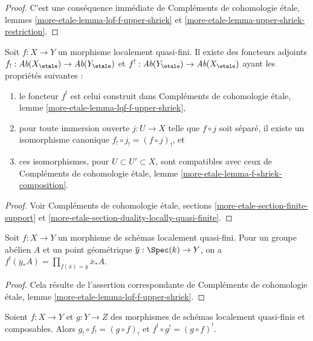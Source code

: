 \begin{proof}
C'est une conséquence immédiate de Compléments de cohomologie étale, lemmes
\ref{more-etale-lemma-lqf-f-upper-shriek} et
\ref{more-etale-lemma-upper-shriek-restriction}.
\end{proof}

\begin{proposition}
\label{proposition-lqf-shriek}
Soit $f : X \to Y$ un morphisme localement quasi-fini. Il existe des
foncteurs adjoints $f_! : \textit{Ab}(X_\etale) \to \textit{Ab}(Y_\etale)$
et $f^! : \textit{Ab}(Y_\etale) \to \textit{Ab}(X_\etale)$
ayant les propriétés suivantes :
\begin{enumerate}
\item le foncteur $f^!$ est celui construit dans Compléments de cohomologie
étale, lemme \ref{more-etale-lemma-lqf-f-upper-shriek},
\item pour toute immersion ouverte $j : U \to X$ telle que $f \circ j$
soit séparé, il existe un isomorphisme canonique
$f_! \circ j_! = (f \circ j)_!$, et
\item ces isomorphismes, pour $U \subset U' \subset X$, sont compatibles
avec ceux de Compléments de cohomologie étale, lemme
\ref{more-etale-lemma-f-shriek-composition}.
\end{enumerate}
\end{proposition}

\begin{proof}
Voir Compléments de cohomologie étale, sections
\ref{more-etale-section-finite-support} et
\ref{more-etale-section-duality-locally-quasi-finite}.
\end{proof}

\begin{lemma}
\label{lemma-lqf-f-upper-shriek-stalk}
Soit $f : X \to Y$ un morphisme de schémas localement quasi-fini.
Pour un groupe abélien $A$ et un point géométrique
$\overline{y} : \Spec(k) \to Y$, on a
$f^!(\overline{y}_*A) = \prod\nolimits_{f(\overline{x}) = \overline{y}}
\overline{x}_*A$.
\end{lemma}

\begin{proof}
Cela résulte de l'assertion correspondante de Compléments de cohomologie
étale, lemme \ref{more-etale-lemma-lqf-f-upper-shriek}.
\end{proof}

\begin{lemma}
\label{lemma-lqf-f-shriek-composition}
Soient $f : X \to Y$ et $g : Y \to Z$ des morphismes de schémas
localement quasi-finis et composables. Alors
$g_! \circ f_! = (g \circ f)_!$ et
$f^! \circ g^! = (g \circ f)^!$.
\end{lemma}

